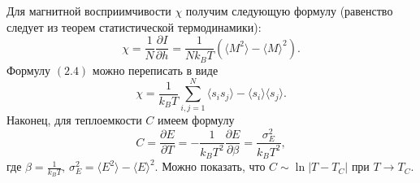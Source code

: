 \documentclass[12pt]{report}
\theoremstyle{definition}
\begin{document}
\noindent Для магнитной восприимчивости $\chi$ получим следующую формулу (равенство следует из теорем статистической термодинамики):
\begin{equation}
    \chi = \frac{1}{N}\frac{\partial I}{\partial h} = \frac{1}{Nk_BT}(\langle M^2 \rangle - \langle M \rangle^2).
\end{equation}
Формулу $(2.4)$ можно переписать в виде
\begin{equation}
    \chi = \frac{1}{k_BT}\sum_{i, j = 1}^N \langle s_is_j \rangle - \langle s_i \rangle \langle s_j \rangle.
\end{equation}
Наконец, для теплоемкости $C$ имеем формулу
\begin{equation}
    C = \frac{\partial E}{\partial T} = -\frac{1}{k_BT^2}\frac{\partial E}{\partial \beta} = \frac{\sigma^2_E}{k_BT^2},
\end{equation}
где $\beta = \frac{1}{k_BT}, \, \sigma_E^2 =  \langle E^2 \rangle - \langle  E \rangle^2$. Можно показать, что $C \sim \ln |T - T_C| \text{ при } T \to T_C$.
\end{document}
